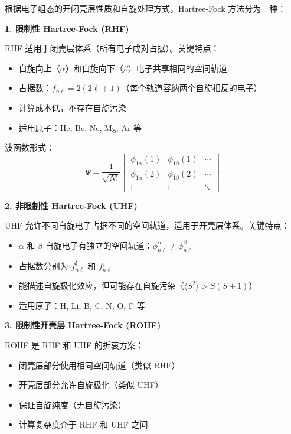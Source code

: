 \documentclass[12pt,a4paper]{article}
\begin{document}
根据电子组态的开闭壳层性质和自旋处理方式，Hartree-Fock 方法分为三种：

\textbf{1. 限制性 Hartree-Fock (RHF)}

RHF 适用于闭壳层体系（所有电子成对占据）。关键特点：
\begin{itemize}
    \item 自旋向上（$\alpha$）和自旋向下（$\beta$）电子共享相同的空间轨道
    \item 占据数：$f_{n\ell} = 2(2\ell + 1)$（每个轨道容纳两个自旋相反的电子）
    \item 计算成本低，不存在自旋污染
    \item 适用原子：He, Be, Ne, Mg, Ar 等
\end{itemize}

波函数形式：
\begin{equation}
    \Psi = \frac{1}{\sqrt{N!}} \begin{vmatrix}
        \phi_{1\alpha}(1) & \phi_{1\beta}(1) & \cdots \\
        \phi_{1\alpha}(2) & \phi_{1\beta}(2) & \cdots \\
        \vdots            & \vdots           & \ddots
    \end{vmatrix}
\end{equation}

\textbf{2. 非限制性 Hartree-Fock (UHF)}

UHF 允许不同自旋电子占据不同的空间轨道，适用于开壳层体系。关键特点：
\begin{itemize}
    \item $\alpha$ 和 $\beta$ 自旋电子有独立的空间轨道：$\phi_{n\ell}^\alpha \neq \phi_{n\ell}^\beta$
    \item 占据数分别为 $f_{n\ell}^\uparrow$ 和 $f_{n\ell}^\downarrow$
    \item 能描述自旋极化效应，但可能存在自旋污染（$\langle S^2 \rangle > S(S+1)$）
    \item 适用原子：H, Li, B, C, N, O, F 等
\end{itemize}

\textbf{3. 限制性开壳层 Hartree-Fock (ROHF)}

ROHF 是 RHF 和 UHF 的折衷方案：
\begin{itemize}
    \item 闭壳层部分使用相同空间轨道（类似 RHF）
    \item 开壳层部分允许自旋极化（类似 UHF）
    \item 保证自旋纯度（无自旋污染）
    \item 计算复杂度介于 RHF 和 UHF 之间
\end{itemize}
\end{document}
